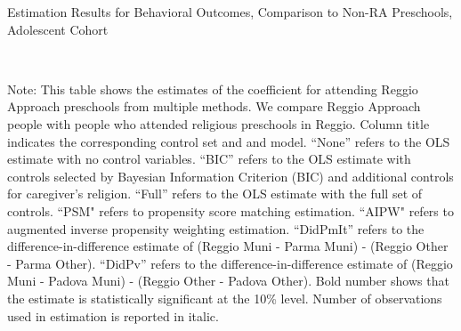 \begin{table}[H] \caption{Estimation Results for Behavioral Outcomes, Comparison to Non-RA Preschools,  Adolescent Cohort} \label{ols-B-adol-reg-reli}
\scalebox{0.8}{}
\vspace{1ex} \\
\footnotesize\raggedright{Note: This table shows the estimates of the coefficient for attending Reggio Approach preschools from multiple methods. We compare Reggio Approach people with people who attended religious preschools in Reggio. Column title indicates the corresponding control set and and model. ``None'' refers to the OLS estimate with no control variables. ``BIC'' refers to the OLS estimate with controls selected by Bayesian Information Criterion (BIC) and additional controls for caregiver's religion. ``Full'' refers to the OLS estimate with the full set of controls. ``PSM" refers to propensity score matching estimation. ``AIPW" refers to augmented inverse propensity weighting estimation. ``DidPmIt'' refers to the difference-in-difference estimate of (Reggio Muni - Parma Muni) - (Reggio Other - Parma Other). ``DidPv'' refers to the difference-in-difference estimate of (Reggio Muni - Padova Muni) - (Reggio Other - Padova Other). Bold number shows that the estimate is statistically significant at the 10\% level. Number of observations used in estimation is reported in italic.}
\end{table}




